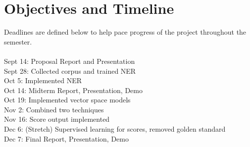 \section{Objectives and Timeline}
\label{section:implementation}
Deadlines are defined below to help pace progress of the project throughout the semester. \\\\
Sept 14: Proposal Report and Presentation\\
Sept 28: Collected corpus and trained NER\\
  Oct 5: Implemented NER \\
 Oct 14: Midterm Report, Presentation, Demo\\
 Oct 19: Implemented vector space models\\
  Nov 2: Combined two techniques\\
 Nov 16: Score output implemented\\
  Dec 6: (Stretch) Supervised learning for scores, removed golden standard\\
  Dec 7: Final Report, Presentation, Demo\\